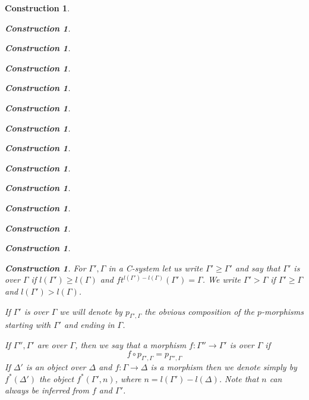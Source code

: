 \documentclass[12pt]{amsart}
\numberwithin{proposition}{subsection}
\newtheorem{construction}[proposition]{Construction}
\newcommand{\sr}{\rightarrow}
\begin{document}
\begin{construction}
\begin{construction}
\begin{construction}
\begin{construction}
\begin{construction}
\begin{construction}
\begin{construction}
\begin{construction}
\begin{construction}
\begin{construction}
\begin{construction}
\begin{construction}
\begin{construction}
\begin{construction}
For $\Gamma',\Gamma$ in a C-system let us write $\Gamma'\ge \Gamma'$ and say
that $\Gamma'$ is over $\Gamma$ if $l(\Gamma')\ge l(\Gamma)$ and
$ft^{l(\Gamma')-l(\Gamma)}(\Gamma')=\Gamma$. We write $\Gamma'>\Gamma$ if
$\Gamma'\ge \Gamma$ and $l(\Gamma')>l(\Gamma)$.

If $\Gamma'$ is over $\Gamma$ we will denote by $p_{\Gamma',\Gamma}$ the
obvious composition of the $p$-morphisms starting with $\Gamma'$ and ending in
$\Gamma$.

If $\Gamma'',\Gamma'$ are over $\Gamma$, then we say that a morphism
$f:\Gamma''\sr \Gamma'$ is over $\Gamma$ if
%
$$f\circ p_{\Gamma',\Gamma}=p_{\Gamma'',\Gamma}$$
%
If $\Delta'$ is an object over $\Delta$ and $f:\Gamma\sr \Delta$ is a morphism
then we denote simply by $f^*(\Delta')$ the object $f^*(\Gamma',n)$, where
$n=l(\Gamma')-l(\Delta)$. Note that $n$ can always be inferred from $f$ and
$\Gamma'$.


\end{construction}
\end{construction}
\end{construction}
\end{construction}
\end{construction}
\end{construction}
\end{construction}
\end{construction}
\end{construction}
\end{construction}
\end{construction}
\end{construction}
\end{construction}
\end{construction}
\end{document}
